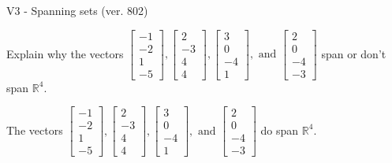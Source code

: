 \begin{exercise}
  \begin{exerciseTitle}V3 - Spanning sets (ver. 802)\end{exerciseTitle}
  \begin{exerciseStatement}
    Explain why the vectors \(\left[\begin{array}{r}
-1 \\
-2 \\
1 \\
-5
\end{array}\right] , \left[\begin{array}{r}
2 \\
-3 \\
4 \\
4
\end{array}\right] , \left[\begin{array}{r}
3 \\
0 \\
-4 \\
1
\end{array}\right] , \text{ and } \left[\begin{array}{r}
2 \\
0 \\
-4 \\
-3
\end{array}\right]\) span or don't span \(\mathbb{R}^4\). 
	


  \end{exerciseStatement}
  \begin{exerciseAnswer}
   The vectors \(\left[\begin{array}{r}
-1 \\
-2 \\
1 \\
-5
\end{array}\right] , \left[\begin{array}{r}
2 \\
-3 \\
4 \\
4
\end{array}\right] , \left[\begin{array}{r}
3 \\
0 \\
-4 \\
1
\end{array}\right] , \text{ and } \left[\begin{array}{r}
2 \\
0 \\
-4 \\
-3
\end{array}\right]\) 
  	 do  
	span \(\mathbb{R}^4\).
  


  \end{exerciseAnswer}
\end{exercise}